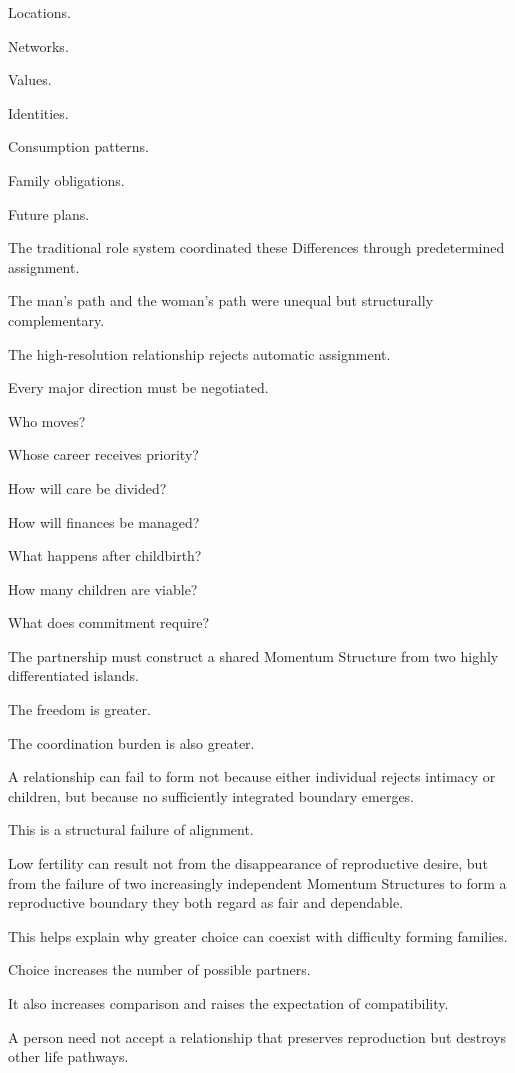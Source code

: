 Locations.

Networks.

Values.

Identities.

Consumption patterns.

Family obligations.

Future plans.

The traditional role system coordinated these Differences through predetermined assignment.

The man’s path and the woman’s path were unequal but structurally complementary.

The high-resolution relationship rejects automatic assignment.

Every major direction must be negotiated.

Who moves?

Whose career receives priority?

How will care be divided?

How will finances be managed?

What happens after childbirth?

How many children are viable?

What does commitment require?

The partnership must construct a shared Momentum Structure from two highly differentiated islands.

The freedom is greater.

The coordination burden is also greater.

A relationship can fail to form not because either individual rejects intimacy or children, but because no sufficiently integrated boundary emerges.

This is a structural failure of alignment.

Low fertility can result not from the disappearance of reproductive desire, but from the failure of two increasingly independent Momentum Structures to form a reproductive boundary they both regard as fair and dependable.

This helps explain why greater choice can coexist with difficulty forming families.

Choice increases the number of possible partners.

It also increases comparison and raises the expectation of compatibility.

A person need not accept a relationship that preserves reproduction but destroys other life pathways.

